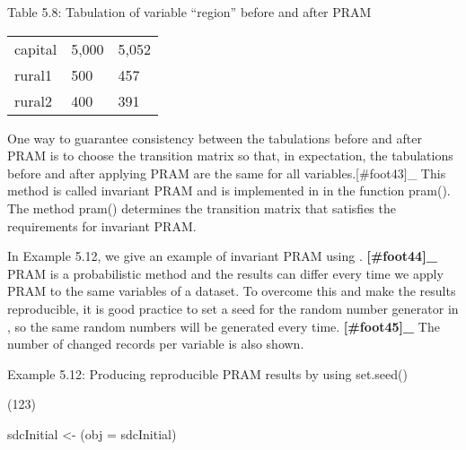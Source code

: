 \documentclass[letterpaper,10pt,english]{sphinxmanual}
\begin{document}
Table 5.8: Tabulation of variable “region” before and after PRAM


\begin{savenotes}\sphinxattablestart
\centering
\begin{tabulary}{\linewidth}[t]{|T|T|T|}
\hline
\sphinxstyletheadfamily 
{}
&\sphinxstyletheadfamily 
{}
&\sphinxstyletheadfamily 
{}
\\
\hline
capital
&
5,000
&
5,052
\\
\hline
rural1
&
500
&
457
\\
\hline
rural2
&
400
&
391
\\
\hline
\end{tabulary}
\par
\sphinxattableend\end{savenotes}

One way to guarantee consistency between the tabulations before and
after PRAM is to choose the transition matrix so that, in expectation,
the tabulations before and after applying PRAM are the same for all
variables.{[}\#foot43{]}\_ This method is called invariant PRAM
and is implemented in  in the function pram(). The method
pram() determines the transition matrix that satisfies the requirements
for invariant PRAM. 

In Example 5.12, we give an example of invariant PRAM using
. {\color{red}\bfseries{}{[}\#foot44{]}\_} PRAM is a probabilistic method and the
results can differ every time we apply PRAM to the same variables of a
dataset. To overcome this and make the results reproducible, it is good
practice to set a seed for the random number generator in , so the
same random numbers will be generated every time. {\color{red}\bfseries{}{[}\#foot45{]}\_}
The number of changed records per variable is also shown.

Example 5.12: Producing reproducible PRAM results by using set.seed()

\begin{DUlineblock}{0em}
\item[] 
\item[] (123)
\item[] 
\item[] sdcInitial \textless{}- (obj = sdcInitial)
\end{DUlineblock}
\end{document}

